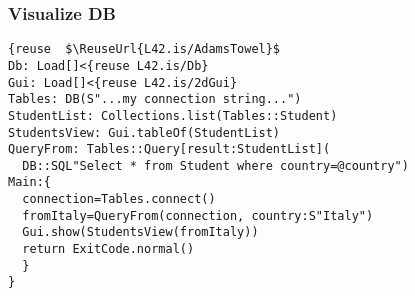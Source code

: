 
\begin{frame}[fragile]
\frametitle{Visualize DB}
\begin{NiceCode}{59ex}{1}
\begin{lstlisting}
{reuse  $\ReuseUrl{L42.is/AdamsTowel}$
Db: Load[]<{reuse L42.is/Db}
Gui: Load[]<{reuse L42.is/2dGui}
Tables: DB(S"...my connection string...")
StudentList: Collections.list(Tables::Student)
StudentsView: Gui.tableOf(StudentList)
QueryFrom: Tables::Query[result:StudentList](
  DB::SQL"Select * from Student where country=@country")
Main:{
  connection=Tables.connect()
  fromItaly=QueryFrom(connection, country:S"Italy")
  Gui.show(StudentsView(fromItaly))
  return ExitCode.normal()
  }
}
\end{lstlisting}
\end{NiceCode}
\end{frame}



